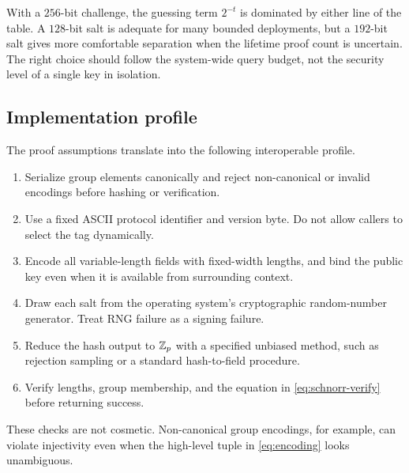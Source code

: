 With a $256$-bit challenge, the guessing term $2^{-t}$ is dominated by either
line of the table.  A $128$-bit salt is adequate for many bounded deployments,
but a $192$-bit salt gives more comfortable separation when the lifetime proof
count is uncertain.  The right choice should follow the system-wide query
budget, not the security level of a single key in isolation.

\subsection{Implementation profile}

The proof assumptions translate into the following interoperable profile.

\begin{enumerate}
  \item Serialize group elements canonically and reject non-canonical or
        invalid encodings before hashing or verification.
  \item Use a fixed ASCII protocol identifier and version byte.  Do not allow
        callers to select the tag dynamically.
  \item Encode all variable-length fields with fixed-width lengths, and bind
        the public key even when it is available from surrounding context.
  \item Draw each salt from the operating system's cryptographic random-number
        generator.  Treat RNG failure as a signing failure.
  \item Reduce the hash output to $\mathbb{Z}_p$ with a specified unbiased method, such
        as rejection sampling or a standard hash-to-field procedure.
  \item Verify lengths, group membership, and the equation in
        \cref{eq:schnorr-verify} before returning success.
\end{enumerate}

These checks are not cosmetic.  Non-canonical group encodings, for example,
can violate injectivity even when the high-level tuple in \cref{eq:encoding}
looks unambiguous.
